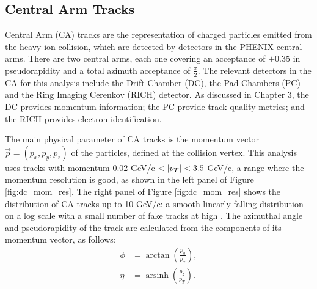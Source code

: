 \subsection{Central Arm Tracks}
Central Arm (CA) tracks are the representation of charged particles emitted from the heavy ion collision, which are detected by detectors in the PHENIX central arms. There are two central arms, each one covering an acceptance of $\pm 0.35$ in pseudorapidity and a total azimuth acceptance of $\frac{\pi}{2}$. The relevant detectors in the CA for this analysis include the Drift Chamber (DC), the Pad Chambers (PC) and the Ring Imaging Cerenkov (RICH) detector. As discussed in Chapter 3, the DC provides momentum information; the PC provide track quality metrics; and the RICH provides electron identification. 

The main physical parameter of CA tracks is the momentum vector $\vec{p} = (p_x, p_y, p_z)$ of the particles, defined at the collision vertex. This analysis uses tracks with momentum 0.02 GeV/c $< |\mbox{$p_T$}| < 3.5$ GeV/c, a \pt range where the momentum resolution is good, as shown in the left panel of Figure \ref{fig:dc_mom_res}. The right panel of Figure \ref{fig:dc_mom_res} shows the \pt distribution of CA tracks up to 10 GeV/c: a smooth linearly falling distribution on a log scale with a small number of fake tracks at high \pt. The azimuthal angle and pseudorapidity of the track are calculated from the components of its momentum vector, as follows: 
\begin{align}
\phi &= \arctan( \frac{p_y}{p_x} ),\\
\eta &= \operatorname{arsinh}(\frac{p_z}{p_T}). 
\label{eqn:phi_eta_form}
\end{align}

